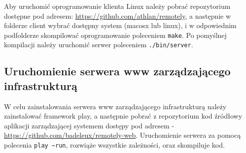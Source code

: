 Aby uruchomić oprogramowanie klienta Linux należy pobrać repozytorium dostępne pod adresem: \url{https://github.com/athlan/remotely}, a następnie w folderze client wybrać dostępny system (macosx lub linux), i w odpowiednim podfolderze skompilować oprogramowanie poleceniem \lstinline{make}.
Po pomyślnej kompilacji należy uruchomić serwer poleceniem \lstinline{./bin/server}.


\subsection{Uruchomienie serwera www zarządzającego infrastrukturą}

W celu zainstalowania serwera www zarządzającego infrastrukturą należy zainstalować framework play, a następnie pobrać z repozytorium kod źródłowy aplikacji zarządzającej systemem dostępy pod adresem - \url{https://github.com/badeleux/remotely-web}. Uruchomienie serwera za pomocą polecenia \lstinline|play ~run|, rozwiąże wszystkie zależności, oraz skompiluje kod. 
